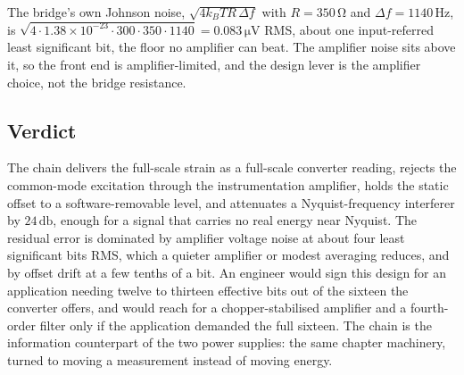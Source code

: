 The bridge's own Johnson noise, $\sqrt{4k_B T R\,\Delta f}$ with $R =
350\,\si{\ohm}$ and $\Delta f = 1140\,\si{\hertz}$, is $\sqrt{4\cdot
1.38\times 10^{-23}\cdot 300\cdot 350\cdot 1140} = 0.083\,\si{\micro
\volt}$ RMS, about one input-referred least significant bit, the floor no
amplifier can beat. The amplifier noise sits above it, so the front end
is amplifier-limited, and the design lever is the amplifier choice, not
the bridge resistance.

\subsection{Verdict}

The chain delivers the full-scale strain as a full-scale converter
reading, rejects the common-mode excitation through the instrumentation
amplifier, holds the static offset to a software-removable level, and
attenuates a Nyquist-frequency interferer by $24\,\si{\decibel}$, enough
for a signal that carries no real energy near Nyquist. The residual error
is dominated by amplifier voltage noise at about four least significant
bits RMS, which a quieter amplifier or modest averaging reduces, and by
offset drift at a few tenths of a bit. An engineer would sign this design
for an application needing twelve to thirteen effective bits out of the
sixteen the converter offers, and would reach for a chopper-stabilised
amplifier and a fourth-order filter only if the application demanded the
full sixteen. The chain is the information counterpart of the two power
supplies: the same chapter machinery, turned to moving a measurement
instead of moving energy.

